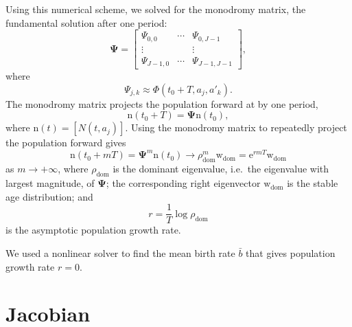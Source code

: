 \documentclass[USenglish]{article}
\renewcommand{\vec}[1]{\boldsymbol{\mathrm{#1}}}
\newcommand{\mat}[1]{\mathbf{#1}}
\newcommand{\me}{\mathrm{e}}
\begin{document}
Using this numerical scheme, we solved for the monodromy matrix, the
fundamental solution after one period:
\begin{equation}
  \mat{\Psi} =
  \begin{bmatrix}
    \Psi_{0, 0} & \cdots & \Psi_{0, J - 1} \\
    \vdots & & \vdots \\
    \Psi_{J - 1, 0} & \cdots & \Psi_{J - 1, J - 1}
  \end{bmatrix},
\end{equation}
where
\begin{equation}
  \Psi_{j, k} \approx \Phi(t_0 + T, a_j, a'_k).
\end{equation}
The monodromy matrix projects the population forward at by one period,
\begin{equation}
  \vec{n}(t_0 + T) = \mat{\Psi} \vec{n}(t_0),
\end{equation}
where $\vec{n}(t) = [N(t, a_j)]$.
Using the monodromy matrix to repeatedly project the population
forward gives
\begin{equation}
  \vec{n}(t_0 + m T)
  = \mat{\Psi}^m \vec{n}(t_0)
  \to \rho_{\mathrm{dom}}^m \vec{w}_{\mathrm{dom}}
  = \me^{r m T} \vec{w}_{\mathrm{dom}}
\end{equation}
as $m \to +\infty$, where $\rho_{\mathrm{dom}}$ is the dominant eigenvalue,
i.e.~the eigenvalue with largest magnitude, of $\mat{\Psi}$;
the corresponding right eigenvector $\vec{w}_{\mathrm{dom}}$ is the
stable age distribution; and
\begin{equation}
  r = \frac{1}{T} \log \rho_{\mathrm{dom}}
\end{equation}
is the asymptotic population growth rate.

We used a nonlinear solver to find the mean birth rate $\bar{b}$ that
gives population growth rate $r = 0$.


\section{Jacobian}
\end{document}
